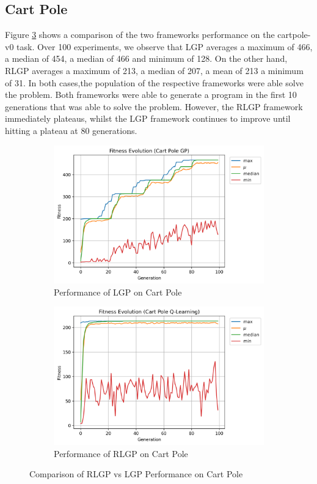 \documentclass[12pt, final]{dalcsthesis}
\begin{document}
\subsection{Cart Pole}

Figure \ref{fig:cart-pole-comparison} shows a comparison of the two frameworks performance on the cartpole-v0 task. Over 100 experiments, we observe that LGP averages a maximum of 466, a median of 454, a median of 466 and minimum of 128. On the other hand, RLGP
averages a maximum of 213, a median of 207, a mean of 213 a minimum of 31. In both cases,the population of the respective frameworks were able solve the problem. Both frameworks were able
to generate a program in the first 10 generations that was able to solve the problem. However, the RLGP framework immediately plateaus, whilst the LGP framework continues to improve until hitting a plateau at 80 generations.

\begin{figure}[hb]
	\centering
	\begin{subfigure}{1.0\textwidth}
		\includegraphics[width=\linewidth]{cart_pole_lgp.png}
		\caption{Performance of LGP on Cart Pole}
		\label{fig:cart-pole-lgp}
	\end{subfigure}
	\hfill
	\begin{subfigure}{1.0\textwidth}
		\includegraphics[width=\linewidth]{cart_pole_q.png}
		\caption{Performance of RLGP on Cart Pole}
		\label{fig:cart-pole-q}
	\end{subfigure}
	\caption{Comparison of RLGP vs LGP Performance on Cart Pole}
	\label{fig:cart-pole-comparison}
\end{figure}
\end{document}
